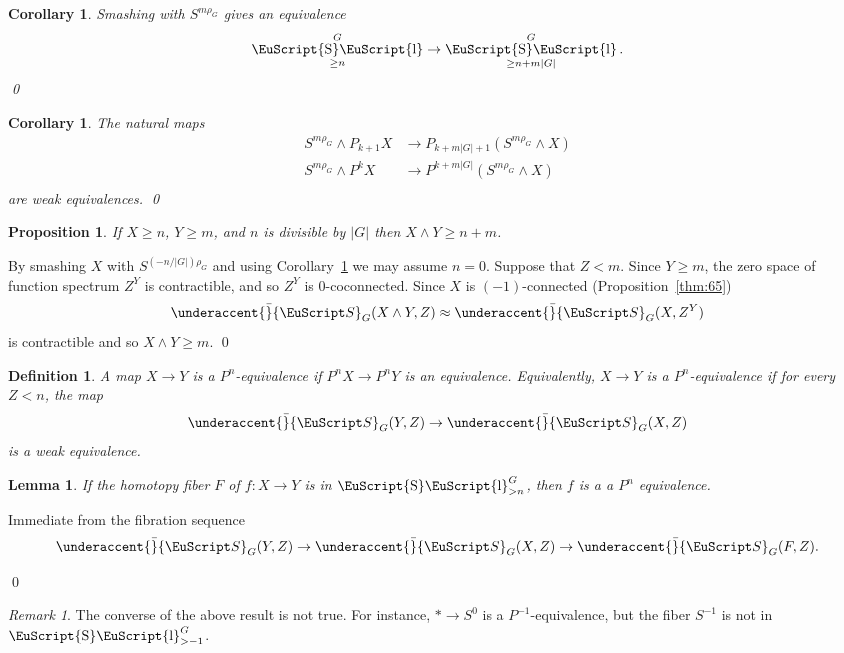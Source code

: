 \documentclass{amsart}
\newtheorem{cor}[equation]{Corollary}
\newtheorem{lem}[equation]{Lemma}
\newtheorem{prop}[equation]{Proposition}
\newtheorem{definition}[equation]{Definition}
\newenvironment{defin}{\begin{definition}\rm}{\end{definition}}
\newtheorem{rem}[equation]{Remark}
\theoremstyle{definition}
\newtheorem{defin}[equation]{Definition}
\theoremstyle{remark}
\newtheorem{rem}[equation]{Remark}
\newenvironment{pf}{\bigskip{\em Proof:\/}}{\qed\medskip}
\newcommand{\spectra}{\EuScript S}
\DeclareMathOperator{\slicesymbol}{\EuScript{S}\EuScript{l}}
\newcommand{\gslice}[1]{\slicesymbol^{G}_{>{#1}}}
\newcommand{\geslice}[1]{\slicesymbol^{G}_{\ge{#1}}}
\newcommand{\gspectra}[1]{\underaccent{\bar}{\spectra}_{#1}}
\begin{document}
\begin{cor}
\label{thm:29}
Smashing with $S^{m\rho_{G}}$ gives an equivalence
\[
\geslice{n} \to \geslice{n+m|G|}.
\]
\qed
\end{cor}

\begin{cor}
\label{thm:70}
The natural maps
\begin{align*}
S^{m\rho_{G}}\wedge P_{k+1} X &\to P_{k+m|G|+1}\left(S^{m\rho_{G}}\wedge
X\right) \\
S^{m\rho_{G}}\wedge P^{k} X &\to P^{k+m|G|}\left(S^{m\rho_{G}}\wedge
X\right) \\
\end{align*}
are weak equivalences.  \qed
\end{cor}

\begin{prop}
\label{thm:6}
If $X\ge n$,  $Y\ge m$, and $n$ is divisible by $|G|$ then $X\wedge Y\ge n+m$.
\end{prop}

\begin{pf}
By smashing $X$ with $S^{(-n/|G|)\rho_{G}}$ and using
Corollary~\ref{thm:70} we may assume $n=0$.  Suppose that $Z<m$.
Since $Y\ge m$, the zero space of function spectrum $Z^{Y}$ is
contractible, and so $Z^{Y}$ is $0$-coconnected.   Since $X$ is
$(-1)$-connected (Proposition~\ref{thm:65})
\[
\gspectra{G}(X\wedge Y,Z) \approx 
\gspectra{G}(X, Z^{Y})
\]
is contractible and so $X\wedge Y\ge m$.
\end{pf}

\begin{defin}
\label{def:25}
A map $X\to Y$ is a {\em $P^{n}$-equivalence} if
$P^{n}X\to P^{n}Y$ is an equivalence.   Equivalently, $X\to Y$ is a
$P^{n}$-equivalence if for every $Z<n$, the map 
\[
\gspectra{G}(Y,Z) \to \gspectra{G}(X,Z)
\]
is a weak equivalence.
\end{defin}


\begin{lem}
\label{thm:104} If the homotopy fiber $F$ of $f:X\to Y$ is in $\gslice{n}$,
then $f$ is a a $P^{n}$ equivalence.
\end{lem}

\begin{pf}
Immediate from the fibration sequence 
\[
\gspectra{G}(Y,Z) \to \gspectra{G}(X,Z) \to \gspectra{G}(F,Z).
\]

\end{pf}

\begin{rem}
\label{rem:9} The converse of the above result is not true.  For
instance, $\ast\to S^{0}$ is a $P^{-1}$-equivalence, but the fiber
$S^{-1}$ is not in $\gslice{-1}$.
\end{rem}
\end{document}
